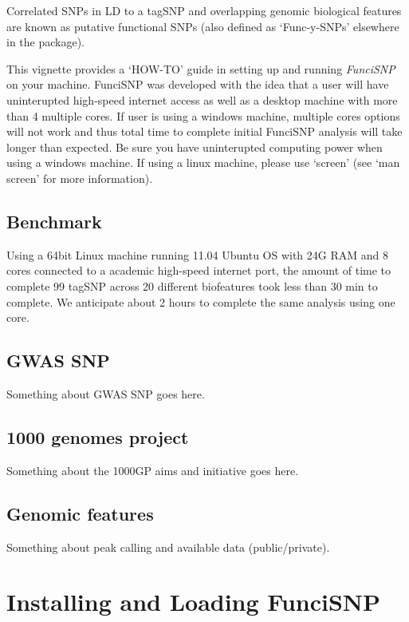 \documentclass[12pt,fullpage]{article}
\newcommand{\Rpackage}[1]{{\textit{#1}}}
\begin{document}
Correlated SNPs in LD to a tagSNP and overlapping genomic biological features
are known as putative functional SNPs (also defined as `Func-y-SNPs' elsewhere
        in the package).

This vignette provides a `HOW-TO' guide in setting up and running
\Rpackage{FunciSNP} on your machine. FunciSNP was developed with the idea that a
user will have uninterupted high-speed internet access as well as a desktop
machine with  more than 4 multiple cores. If user is using a windows machine,
multiple cores options will not work and thus total time to complete
initial FunciSNP analysis will take longer than expected. Be sure you
have uninterupted computing power when using a windows machine. If using
a linux machine, please use `screen' (see `man screen' for more
information).
\subsection{Benchmark}
Using a 64bit Linux machine running 11.04 Ubuntu OS with 24G RAM and 8 cores
connected to a academic high-speed internet port, the amount of time to complete
99 tagSNP across 20 different biofeatures took less than 30 min to complete. We
anticipate about 2 hours to complete the same analysis using one core.

\subsection{GWAS SNP}
Something about GWAS SNP goes here.

\subsection{1000 genomes project}
Something about the 1000GP aims and initiative goes here. 

\subsection{Genomic features}
Something about peak calling and available data (public/private).

\section{Installing and Loading FunciSNP}
\end{document}
